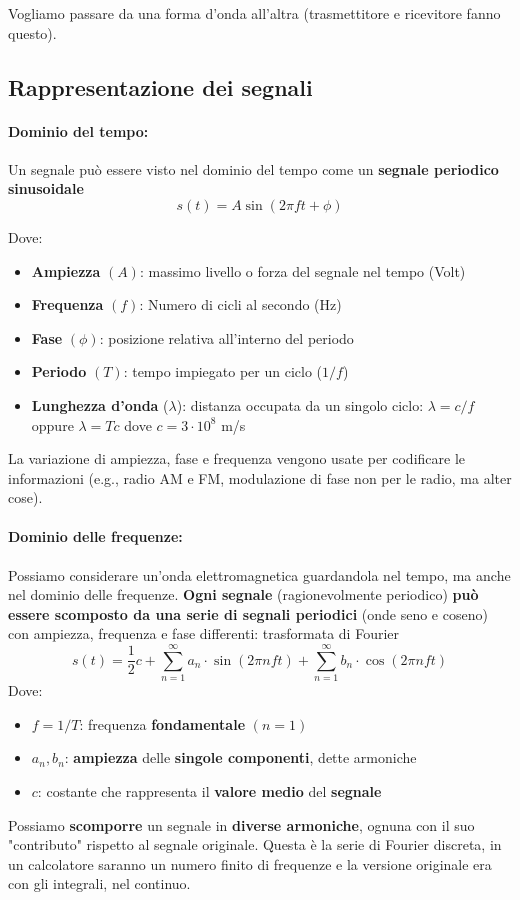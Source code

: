 Vogliamo passare da una forma d'onda all'altra (trasmettitore e ricevitore fanno questo). 

\newpage

\subsection{Rappresentazione dei segnali}

\paragraph{Dominio del tempo:} Un segnale può essere visto nel dominio del tempo come un \textbf{segnale periodico sinusoidale}
$$ s(t) = A \sin (2 \pi ft + \phi) $$

Dove: 
\begin{itemize}
	\item \textbf{Ampiezza} $(A)$:	massimo livello o forza del segnale nel tempo (Volt)
	\item \textbf{Frequenza} $(f)$: Numero di cicli al secondo (Hz)
	\item \textbf{Fase} $(\phi)$: posizione relativa all'interno del periodo
	\item \textbf{Periodo} $(T)$: tempo impiegato per un ciclo ($1/f$)
	\item \textbf{Lunghezza d'onda} ($\lambda$): distanza occupata da un singolo ciclo: $\lambda = c/f$ oppure $\lambda = T c$ dove $c = 3\cdot 10^8$ m/s
\end{itemize}
La variazione di ampiezza, fase e frequenza vengono usate per codificare le informazioni (e.g., radio AM e FM, modulazione di fase non per le radio, ma alter cose).

\paragraph{Dominio delle frequenze:} Possiamo considerare un'onda elettromagnetica guardandola nel tempo, ma anche nel dominio delle frequenze. \textbf{Ogni segnale} (ragionevolmente periodico) \textbf{può essere scomposto da una serie di segnali periodici} (onde seno e coseno) con ampiezza, frequenza e fase differenti: trasformata di Fourier
$$ s(t) = \frac{1}{2} c + \sum_{n=1}^{\infty} a_n \cdot \sin (2 \pi n f t) + \sum_{n=1}^{\infty} b_n \cdot \cos (2 \pi n f t) $$
Dove: 
\begin{itemize}
	\item $f=1/T$: frequenza \textbf{fondamentale} $(n=1)$
	\item $a_n, b_n$: \textbf{ampiezza} delle \textbf{singole componenti}, dette armoniche
	\item $c$: costante che rappresenta il \textbf{valore medio} del \textbf{segnale}
\end{itemize}
Possiamo \textbf{scomporre} un segnale in \textbf{diverse armoniche}, ognuna con il suo "contributo" rispetto al segnale originale. Questa è la serie di Fourier discreta, in un calcolatore saranno un numero finito di frequenze e la versione originale era con gli integrali, nel continuo.\\

